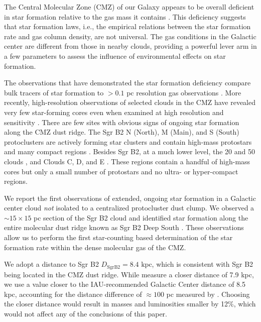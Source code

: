 \documentclass[twocolumn]{aastex61}
\newcommand{\dsgrb}{\ensuremath{8.4\textrm{~kpc}}\xspace}
\begin{document}
The Central Molecular Zone (CMZ) of our Galaxy appears to be overall deficient
in star formation relative to the gas mass it contains \citep{Longmore2013a,
Kauffmann2016a,Kauffmann2016b,Barnes2016c,Barnes2017b}.  This deficiency
suggests that star formation laws, i.e., the empirical relations between
the star formation rate and gas column density, are not universal.  The gas
conditions in the Galactic center are different from those in nearby clouds,
providing a powerful lever arm in a few
parameters \citep[e.g., pressure, temperature, velocity
dispersion;
][]{Kruijssen2013a,Ginsburg2016a,Immer2016a,Shetty2012a,Henshaw2016a} to assess
the influence of environmental effects on star formation.


The observations that have demonstrated the star formation deficiency compare
bulk tracers of star formation to $>0.1$ pc resolution gas observations
\citep[e.g.][]{Barnes2017b}.  More recently, high-resolution observations
of selected clouds in the CMZ have revealed very few star-forming cores
even when examined at high resolution and sensitivity
\citep{Rathborne2014a,Rathborne2015a,Kauffmann2016a,Kauffmann2016b}.  There are 
few sites with obvious signs of ongoing star formation along the CMZ dust ridge.
The Sgr B2
N (North), M (Main), and S (South) protoclusters \citep[][Figure
\ref{fig:overview}]{Schmiedeke2016a} are actively  forming star clusters
and contain high-mass protostars and many compact \hii regions
\citep[e.g.][]{Higuchi2015a,Gaume1995a}. 
Besides Sgr B2, at a much lower level, the 20 \kms and 50 \kms clouds
\citep{Lu2016a,2017a}, and Clouds C, D, and E \citep[][Walker et al, in
prep;]{Ginsburg2015b,Barnes2017b}.  These regions contain a handful of
high-mass cores but only a small number of protostars and no ultra-
or hyper-compact \hii regions.

We report the first observations of extended, ongoing star formation in a
Galactic center cloud \emph{not} isolated to a centralized protocluster dust
clump.  We observed a $\sim15\times15$ pc section of the Sgr B2 cloud and
identified star formation along the entire molecular dust ridge known as Sgr B2
Deep South \citep[DS, also known as the `Southern
Complex'][]{Jones2012a,Schmiedeke2016a}.  These observations allow us to
perform the first
star-counting based determination of the star formation rate within the dense
molecular gas of the CMZ.

We adopt a distance to Sgr B2 $D_{\mathrm{Sgr B2}}=\dsgrb$, which is consistent
with Sgr B2 being
located in the CMZ dust ridge.  While \citet{Reid2009a} measure a closer
distance of 7.9 kpc, we use a value closer to the IAU-recommended Galactic
Center distance of 8.5 kpc, accounting for the distance difference of
$\approx100$ pc measured by \citet{Reid2009a}.  Choosing the closer distance
would result in masses and luminosities smaller by 12\%, which would not
affect any of the conclusions of this paper.
\end{document}
